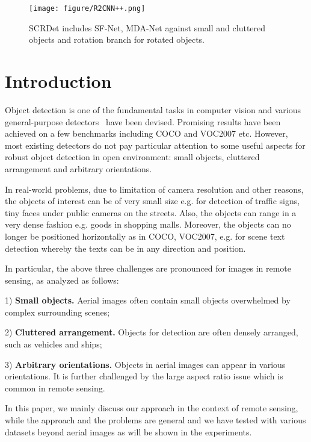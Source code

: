 \documentclass[10pt,twocolumn,letterpaper]{article}
\begin{document}
\begin{figure*}[!tb]
		\begin{center}
			\texttt{[image: figure/R2CNN++.png]}
		\end{center}
		\vspace{-20pt}
		\caption{SCRDet includes SF-Net, MDA-Net against small and cluttered objects and rotation branch for rotated objects.}
		\label{fig:R2CNN++}
	\end{figure*}
	
	\section{Introduction}
	Object detection is one of the fundamental tasks in computer vision and various general-purpose detectors~\cite{girshick2014rich,he2014spatial,girshick2015fast,liu2016ssd,redmon2016you,dai2016r,ren2017faster} have been devised. Promising results have been achieved on a few benchmarks including COCO \cite{lin2014microsoft} and VOC2007 \cite{everingham2010pascal} etc. However, most existing detectors do not pay particular attention to some useful aspects for robust object detection in open environment: small objects, cluttered arrangement and arbitrary orientations.
	
	In real-world problems, due to limitation of camera resolution and other reasons, the objects of interest can be of very small size e.g. for detection of traffic signs, tiny faces under public cameras on the streets. Also, the objects can range in a very dense fashion e.g. goods in shopping malls. Moreover, the objects can no longer be positioned horizontally as in COCO, VOC2007, e.g. for scene text detection whereby the texts can be in any direction and position.
	
	In particular, the above three challenges are pronounced for images in remote sensing, as analyzed as follows:
	
	1) \textbf{Small objects.} Aerial images often contain small objects overwhelmed by complex surrounding scenes;
	
	2) \textbf{Cluttered arrangement.} Objects for detection are often densely arranged, such as vehicles and ships;
	
	3) \textbf{Arbitrary orientations.} Objects in aerial images can appear in various orientations. It is further challenged by the large aspect ratio issue which is common in remote sensing.
	
	In this paper, we mainly discuss our approach in the context of remote sensing, while the approach and the problems are general and we have tested with various datasets beyond aerial images as will be shown in the experiments.
	
\end{document}
